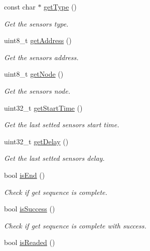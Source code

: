 \begin{DoxyCompactItemize}
const char $\ast$ \hyperlink{classSensorDriver_a3d87944d9f86320f645af7dad549e4a8}{get\+Type} ()
\begin{DoxyCompactList}\small\item\em Get the sensor\textquotesingle{}s type. \end{DoxyCompactList}\item 
uint8\+\_\+t \hyperlink{classSensorDriver_a3f0ac74e7502159bac092a1fd4d05dda}{get\+Address} ()
\begin{DoxyCompactList}\small\item\em Get the sensor\textquotesingle{}s address. \end{DoxyCompactList}\item 
uint8\+\_\+t \hyperlink{classSensorDriver_a30e20150ec52e3ec3a7257978e533618}{get\+Node} ()
\begin{DoxyCompactList}\small\item\em Get the sensor\textquotesingle{}s node. \end{DoxyCompactList}\item 
uint32\+\_\+t \hyperlink{classSensorDriver_a8636758f202044a24e916d10bf339f10}{get\+Start\+Time} ()
\begin{DoxyCompactList}\small\item\em Get the last setted sensor\textquotesingle{}s start time. \end{DoxyCompactList}\item 
uint32\+\_\+t \hyperlink{classSensorDriver_a432c4878ec9ca5145a4bdd827ebbc7d7}{get\+Delay} ()
\begin{DoxyCompactList}\small\item\em Get the last setted sensor\textquotesingle{}s delay. \end{DoxyCompactList}\item 
bool \hyperlink{classSensorDriver_a8ababf180e52d684416bc6f4c4f90e59}{is\+End} ()
\begin{DoxyCompactList}\small\item\em Check if get sequence is complete. \end{DoxyCompactList}\item 
bool \hyperlink{classSensorDriver_af8d094335bc75fbf1390ee5b498eec69}{is\+Success} ()
\begin{DoxyCompactList}\small\item\em Check if get sequence is complete with success. \end{DoxyCompactList}\item 
bool \hyperlink{classSensorDriver_a65f1930e35568439dee39259a23a5670}{is\+Readed} ()

\end{DoxyCompactItemize}
